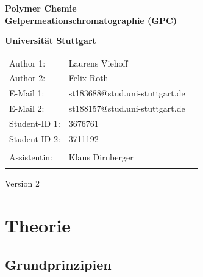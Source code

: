 \documentclass[10pt,a4paper,ngerman]{scrartcl}
\begin{document}
\begin{titlepage}
	\vspace*{2,5cm}
	\begin{center}
		\begin{LARGE}
			\textbf{Polymer Chemie}\\
			\textbf{Gelpermeationschromatographie (GPC)}\\
		\end{LARGE}
		\vspace{1cm}
		\textbf{Universität Stuttgart}\\
		\vspace*{1,5cm}
		\begin{tabular}{lp{}l}
			Author 1:     &Laurens Viehoff\\
            Author 2:     &Felix Roth\\   
			E-Mail 1:      &st183688@stud.uni-stuttgart.de\\
            E-Mail 2:      &st188157@stud.uni-stuttgart.de  \\
			Student-ID 1: & 3676761   \\ 
            Student-ID 2: & 3711192 \\ \\
			Assistentin:  & Klaus Dirnberger  \\ \\ 
		\end{tabular}
		
		\vspace{2cm}
		Version 2\\
	\end{center}

    
\end{titlepage}
\thispagestyle{empty}
\renewcommand{\thepage}{\arabic{page}}
\newpage
\tableofcontents
\setcounter{page}{1}
\renewcommand{\thepage}{\arabic{page}}
\newpage

\section{Theorie}

	\subsection{Grundprinzipien}
		
\end{document}
